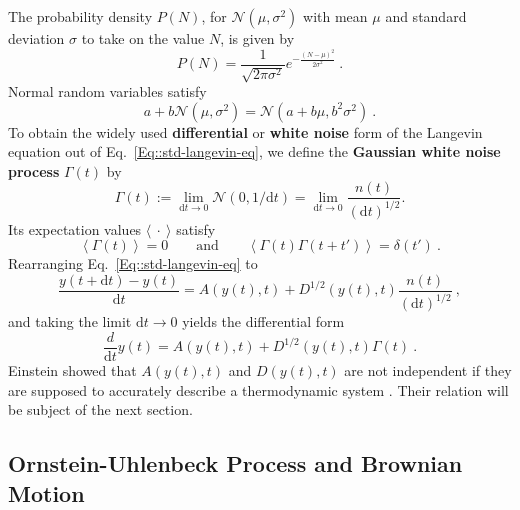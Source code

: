 	The probability density $P(N)$, for $\mathcal{N}(\mu, \sigma^2)$ with mean $\mu$ and standard deviation $\sigma$ to take on the value $N$, is given by
	\begin{equation}
		P(N) =	\frac{1}{\sqrt{2\pi \sigma^2}} e^{-\frac{(N - \mu)^2}{2\sigma^2}} ~.
	\end{equation}
	Normal random variables satisfy
	\begin{equation}
	 	a + b \mathcal{N}(\mu, \sigma^2) =	\mathcal{N}(a + b\mu, b^2\sigma^2)~.
	\end{equation}
	  To obtain the widely used \textbf{differential }or \textbf{white noise }form of the Langevin equation out of Eq.~\eqref{Eq::std-langevin-eq}, we define the \textbf{Gaussian white noise process} $\Gamma(t)$ by
	\begin{equation}
		\Gamma(t) :=	\lim\limits_{\text{d}t \rightarrow 0} \mathcal{N}(0, 1/\text{d}t) = \lim\limits_{\text{d}t \rightarrow 0} \frac{n(t)}{(\text{d}t)^{1/2}}.
	\end{equation}
	Its expectation values $\langle~\cdot~\rangle$ satisfy
	\begin{equation} \label{Eq::Gauss-dist-property}
		\left \langle \Gamma(t) \right \rangle = 0 \qquad \text{and} \qquad  			\left \langle \Gamma(t) \Gamma(t + t')\right \rangle =	\delta(t') ~.
	\end{equation}
	Rearranging Eq.~\eqref{Eq::std-langevin-eq} to
	\begin{equation}
		\frac{y(t + \text{d}t) - y(t)}{\text{d}t} =	A(y(t), t) + D^{1/2} (y(t), t) \frac{n(t)}{(\text{d}t)^{1/2}} ~,
	\end{equation}
	and taking the limit $\text{d}t \rightarrow 0$ yields the differential form
	\begin{equation} \label{Eq::Differential-Langevin-eq}
		\frac{d}{\text{d}t} y(t) =	A(y(t), t) + D^{1/2}(y(t), t) \Gamma(t)~.
	\end{equation}
	Einstein showed that  $A(y(t), t)$ and $D(y(t), t)$ are not independent if they are supposed to accurately describe a thermodynamic system \cite{einstein1905molekularkinetischen}. Their relation will be subject of the next section.
	
	
	\subsection{Ornstein-Uhlenbeck Process and Brownian Motion} \label{Section::Brownian-Motion}
